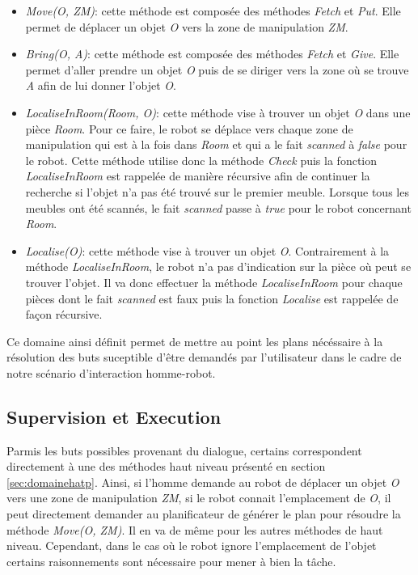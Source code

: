 \documentclass[a4paper,11pt,twoside]{StyleThese}
\begin{document}
\begin{itemize}

\item \textit{Move(O, ZM)}: cette méthode est composée des méthodes \textit{Fetch} et \textit{Put}. Elle permet de déplacer un objet \textit{O} vers la zone de manipulation \textit{ZM}.

\item \textit{Bring(O, A)}: cette méthode est composée des méthodes \textit{Fetch} et \textit{Give}. Elle permet d'aller prendre un objet \textit{O} puis de se diriger vers la zone où se trouve \textit{A} afin de lui donner l'objet \textit{O}.

\item \textit{LocaliseInRoom(Room, O)}: cette méthode vise à trouver un objet \textit{O} dans une pièce \textit{Room}. Pour ce faire, le robot se déplace vers chaque zone de manipulation qui est à la fois dans \textit{Room} et qui a le fait \textit{scanned} à \textit{false} pour le robot. Cette méthode utilise donc la méthode \textit{Check} puis la fonction \textit{LocaliseInRoom} est rappelée de manière récursive afin de continuer la recherche si l'objet n'a pas été trouvé sur le premier meuble.
Lorsque tous les meubles ont été scannés, le fait \textit{scanned} passe à \textit{true} pour le robot concernant \textit{Room}.

\item \textit{Localise(O)}: cette méthode vise à trouver un objet \textit{O}. Contrairement à la méthode \textit{LocaliseInRoom}, le robot n'a pas d'indication sur la pièce où peut se trouver l'objet. Il va donc effectuer la méthode \textit{LocaliseInRoom} pour chaque pièces dont le fait \textit{scanned} est faux puis la fonction \textit{Localise} est rappelée de façon récursive.
\end{itemize}

Ce domaine ainsi définit permet de mettre au point les plans nécéssaire à la résolution des buts suceptible d'être demandés par l'utilisateur dans le cadre de notre scénario d'interaction homme-robot.


\subsection{Supervision et Execution}

Parmis les buts possibles provenant du dialogue, certains correspondent directement à une des méthodes haut niveau présenté en section \ref{sec:domainehatp}.
Ainsi, si l'homme demande au robot de déplacer un objet \textit{O} vers une zone de manipulation \textit{ZM}, si le robot connait l'emplacement de \textit{O}, il peut directement demander au planificateur de générer le plan pour résoudre la méthode \textit{Move(O, ZM)}. Il en va de même pour les autres méthodes de haut niveau. Cependant, dans le cas où le robot ignore l'emplacement de l'objet certains raisonnements sont nécessaire pour mener à bien la tâche.
\end{document}
